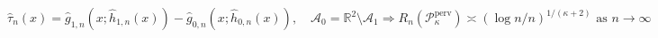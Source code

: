 \(\widehat\tau_n(x)=\widehat g_{1,n}(x;\widehat h_{1,n}(x))-\widehat g_{0,n}(x;\widehat h_{0,n}(x)),\quad \mathcal A_0=\mathbb R^2\setminus\mathcal A_1\Longrightarrow R_n(\mathcal P_{\kappa}^{\mathrm{perv}})\asymp(\log n/n)^{1/(\kappa+2)}\text{ as }n\to\infty\)